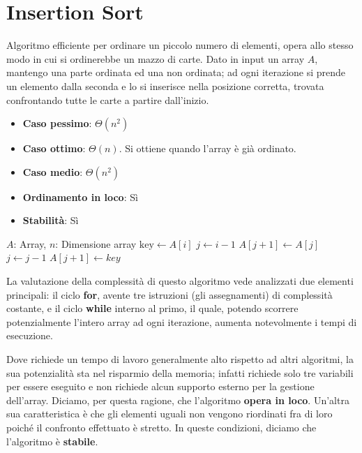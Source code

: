 \section{Insertion Sort}
Algoritmo efficiente per ordinare un piccolo numero di elementi, opera allo stesso modo in cui si ordinerebbe un mazzo di carte. Dato in input un array $A$, mantengo una parte ordinata ed una non ordinata; ad ogni iterazione si prende un elemento dalla seconda e lo si inserisce nella posizione corretta, trovata confrontando tutte le carte a partire dall'inizio. \begin{itemize}
	\item \textbf{Caso pessimo}: $\Theta(n^2)$
	\item \textbf{Caso ottimo}: $\Theta(n)$. Si ottiene quando l'array è già ordinato.
	\item \textbf{Caso medio}: $\Theta(n^2)$
	\item \textbf{Ordinamento in loco}: Sì
	\item \textbf{Stabilità}: Sì
\end{itemize}
\begin{algorithm}[H]
	\caption{InsertionSort(A,n)}
	\begin{algorithmic}[1]
		\Require $A$: Array, $n$: Dimensione array
		 
		\State $\text{key} \gets A[i]$
		\State $j \gets i-1$ 
		\State
		 
		\State $A[j+1] \gets A[j]$ 
		\State $j \gets j-1$ 
		\EndWhile
		\State $A[j+1] \gets key$ 
		\EndFor
	\end{algorithmic}
\end{algorithm}
\noindent La valutazione della complessità di questo algoritmo vede analizzati due elementi principali: il ciclo \textbf{for}, avente tre istruzioni (gli assegnamenti) di complessità costante, e il ciclo \textbf{while} interno al primo, il quale, potendo scorrere potenzialmente l'intero array ad ogni iterazione, aumenta notevolmente i tempi di esecuzione.\par
Dove richiede un tempo di lavoro generalmente alto rispetto ad altri algoritmi, la sua potenzialità sta nel risparmio della memoria; infatti richiede solo tre variabili per essere eseguito e non richiede alcun supporto esterno per la gestione dell'array. Diciamo, per questa ragione, che l'algoritmo \textbf{opera in loco}. Un'altra sua caratteristica è che gli elementi uguali non vengono riordinati fra di loro poiché il confronto effettuato è stretto. In queste condizioni, diciamo che l'algoritmo è \textbf{stabile}.

